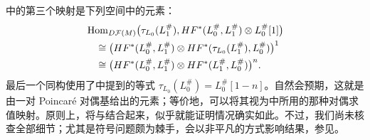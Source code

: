\begin{note}\label{st:17.19}
中的第三个映射是下列空间中的元素：
\[
\begin{aligned}
&\operatorname{Hom}_{D\mathcal F(M)}\bigl(\tau_{L_0}(L_1^\#),HF^*(L_0^\#,L_1^\#)\otimes L_0^\#[1]\bigr)\\
&\quad\cong\bigl(HF^*(L_0^\#,L_1^\#)\otimes HF^*(\tau_{L_0}(L_1^\#),L_0^\#)\bigr)^1\\
&\quad\cong\bigl(HF^*(L_0^\#,L_1^\#)\otimes HF^*(L_1^\#,L_0^\#)\bigr)^n.
\end{aligned}
\]
最后一个同构使用了中提到的等式 $\tau_{L_0}(L_0^\#)=L_0^\#[1-n]$。自然会预期，这就是由一对 Poincaré 对偶基给出的元素；等价地，可以将其视为中所用的那种对偶求值映射。原则上，将与结合起来，似乎就能证明情况确实如此。不过，我们尚未核查全部细节；尤其是符号问题颇为棘手，会以非平凡的方式影响结果，参见。
\end{note}

